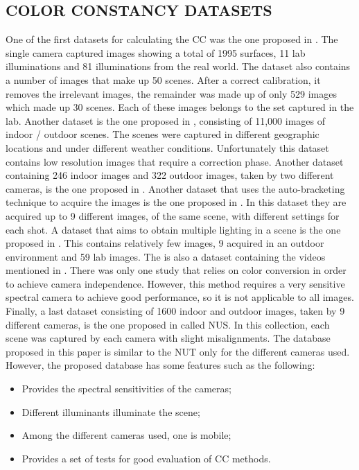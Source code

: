 \subsection{COLOR CONSTANCY DATASETS}
One of the first datasets for calculating the CC was the one proposed in 
\cite{0807099130}. The single camera captured images showing a total of 1995 surfaces, 
11 lab illuminations and 81 illuminations from the real world. The dataset 
also contains a number of images that make up 50 scenes. After a correct 
calibration, it removes the irrelevant images, the remainder was made up of 
only 529 images which made up 30 scenes. Each of these images belongs to 
the set captured in the lab. Another dataset is the one proposed in \cite{0807099132}, consisting 
of 11,000 images of indoor / outdoor scenes. The scenes were captured in 
different geographic locations and under different weather conditions. Unfortunately 
this dataset contains low resolution images that require a correction 
phase. Another dataset containing 246 indoor images and 322 outdoor images, 
taken by two different cameras, is the one proposed in \cite{0807099120}. Another 
dataset that uses the auto-bracketing technique to acquire the images is the 
one proposed in \cite{0807099134}. In this dataset they are acquired up to 9 different 
images, of the same scene, with different settings for each shot. A dataset that 
aims to obtain multiple lighting in a scene is the one proposed in \cite{0807099135}. 
This contains relatively few images, 9 acquired in an outdoor environment 
and 59 lab images. The is also a dataset containing the videos mentioned 
in \cite{0807099136}. There was only one study \cite{0807099129} that relies on color conversion in order 
to achieve camera independence. However, this method requires a very 
sensitive spectral camera to achieve good performance, so it is not applicable 
to all images. Finally, a last dataset consisting of 1600 indoor and outdoor 
images, taken by 9 different cameras, is the one proposed in \cite{0807099128} called NUS. 
In this collection, each scene was captured by each camera with slight misalignments. 
The database proposed in this paper is similar to the NUT only 
for the different cameras used. However, the proposed database has some 
features such as the following:
\begin{itemize}
    \item Provides the spectral sensitivities of the cameras;
    \item Different illuminants illuminate the scene;
    \item Among the different cameras used, one is mobile;
    \item Provides a set of tests for good evaluation of CC methods.
\end{itemize}

